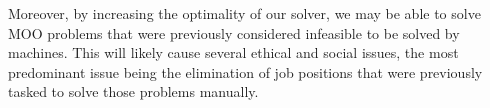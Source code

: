 \documentclass[11pt]{article}
\begin{document}
Moreover, by increasing the optimality of our solver, we may be able to solve MOO
problems that were previously considered infeasible to be solved by
machines. This will likely cause several ethical and social issues,
the most predominant issue being the elimination of job positions that
were previously tasked to solve those problems manually.
\printbibliography[heading=bibintoc]
\end{document}
